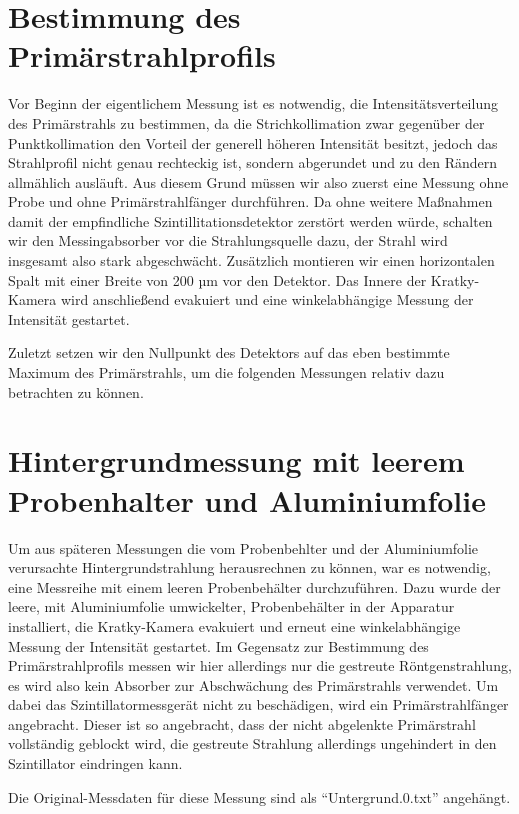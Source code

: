\documentclass[bigchapter,colorback,accentcolor=tud4b,linedtoc,11pt]{tudreport}
\begin{document}
\section{Bestimmung des Primärstrahlprofils}

Vor Beginn der eigentlichem Messung ist es notwendig, die Intensitätsverteilung des Primärstrahls zu bestimmen, da die Strichkollimation zwar gegenüber der Punktkollimation den Vorteil der generell höheren Intensität besitzt, jedoch das Strahlprofil nicht genau rechteckig ist, sondern abgerundet und zu den Rändern allmählich ausläuft. Aus diesem Grund müssen wir also zuerst eine Messung ohne Probe und ohne Primärstrahlfänger durchführen. Da ohne weitere Maßnahmen damit der empfindliche Szintillitationsdetektor zerstört werden würde, schalten wir den Messingabsorber vor die Strahlungsquelle dazu, der Strahl wird insgesamt also stark abgeschwächt. Zusätzlich montieren wir einen horizontalen Spalt mit einer Breite von 200 µm vor den Detektor. Das Innere der Kratky-Kamera wird anschließend evakuiert und eine winkelabhängige Messung der Intensität gestartet. 

Zuletzt setzen wir den Nullpunkt des Detektors auf das eben bestimmte Maximum des Primärstrahls, um die folgenden Messungen relativ dazu betrachten zu können.

\section{Hintergrundmessung mit leerem Probenhalter und Aluminiumfolie}

Um aus späteren Messungen die vom Probenbehlter und der Aluminiumfolie verursachte Hintergrundstrahlung herausrechnen zu können, war es notwendig, eine Messreihe mit einem leeren Probenbehälter durchzuführen. Dazu wurde der leere, mit Aluminiumfolie umwickelter, Probenbehälter in der Apparatur installiert, die Kratky-Kamera evakuiert und erneut eine winkelabhängige Messung der Intensität gestartet. Im Gegensatz zur Bestimmung des Primärstrahlprofils messen wir hier allerdings nur die gestreute Röntgenstrahlung, es wird also kein Absorber zur Abschwächung des Primärstrahls verwendet. Um dabei das Szintillatormessgerät nicht zu beschädigen, wird ein Primärstrahlfänger angebracht. Dieser ist so angebracht, dass der nicht abgelenkte Primärstrahl vollständig geblockt wird, die gestreute Strahlung allerdings ungehindert in den Szintillator eindringen kann.

Die Original-Messdaten für diese Messung sind als "`Untergrund.0.txt"' angehängt.
\end{document}
